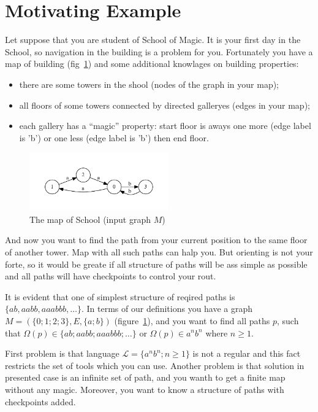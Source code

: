\section{Motivating Example}\label{motivExample}

Let suppose that you are student of School of Magic.
It is your first day in the School, so navigation in the building is a problem for you.
Fortunately you have a map of building (fig~\ref{input}) and some additional knowlages on building properties:
\begin{itemize}
  \item there are some towers in the shool (nodes of the graph in your map);
  \item all floors of some towers connected by directed galleryes (edges in your map);
  \item each gallery has a ``magic'' property: start floor is aways one more (edge label is 'b') or one less (edge label is 'b') then end floor. 
\end{itemize}

\begin{figure}[h]
    \begin{center}
        \includegraphics[width=6cm]{dot/input.pdf}
        \caption{The map of School (input graph $M$)}
        \label{input}        
    \end{center}
\end{figure}


And now you want to find the path from your current position to the same floor of another tower. 
Map with all such paths can halp you.
But orienting is not your forte, so it would be greate if all structure of paths will be ass simple as possible and all paths will have checkpoints to control your rout.

It is evident that one of simplest structure of reqired paths is $\{ab, aabb, aaabbb, \dots\}$.
In terms of our definitions you have a graph $M=(\{0;1;2;3\},E,\{a;b\})$ (figure~\ref{input}), and you want to find all paths $p$, such that $\Omega(p) \in \{ab; aabb; aaabbb; \dots\}$ or $\Omega(p) \in a^n b^n$ where $n \geq 1$.


First problem is that language $\mathcal{L} = \{a^n b^n; n \geq 1\}$ is not a regular and this fact restricts the set of tools which you can use. 
Another problem is that solution in presented case is an infinite set of path, and you wanth to get a finite map without any magic.  
Moreover, you want to know a structure of paths with checkpoints added.

